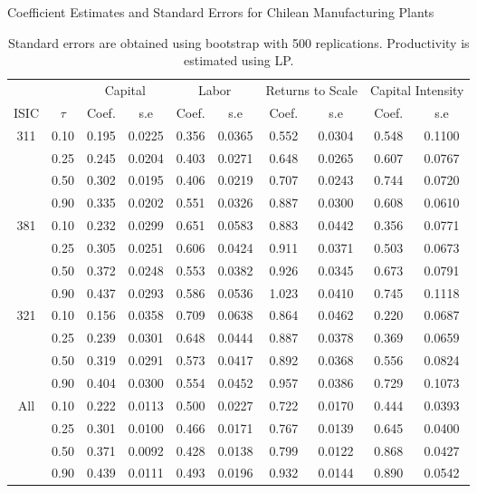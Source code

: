 \documentclass[11pt]{article}
\begin{document}
\begin{table}[H]
\centering
\caption{Coefficient Estimates and Standard Errors for Chilean Manufacturing Plants}
\begin{tabular}{cccccccccc}
  \hline\hline & & \multicolumn{2}{c}{Capital}  & \multicolumn{2}{c}{Labor} & \multicolumn{2}{c}{Returns to Scale} & \multicolumn{2}{c}{Capital Intensity}\\ \cmidrule(lr){3-4} \cmidrule(lr){5-6} \cmidrule(lr){7-8} \cmidrule(lr){9-10}ISIC & $\tau$ & Coef. & s.e & Coef. & s.e & Coef. & s.e & Coef. & s.e \\ 
  \hline
311 & 0.10 & 0.195 & 0.0225 & 0.356 & 0.0365 & 0.552 & 0.0304 & 0.548 & 0.1100 \\ 
   & 0.25 & 0.245 & 0.0204 & 0.403 & 0.0271 & 0.648 & 0.0265 & 0.607 & 0.0767 \\ 
   & 0.50 & 0.302 & 0.0195 & 0.406 & 0.0219 & 0.707 & 0.0243 & 0.744 & 0.0720 \\ 
   & 0.90 & 0.335 & 0.0202 & 0.551 & 0.0326 & 0.887 & 0.0300 & 0.608 & 0.0610 \\ 
  381 & 0.10 & 0.232 & 0.0299 & 0.651 & 0.0583 & 0.883 & 0.0442 & 0.356 & 0.0771 \\ 
   & 0.25 & 0.305 & 0.0251 & 0.606 & 0.0424 & 0.911 & 0.0371 & 0.503 & 0.0673 \\ 
   & 0.50 & 0.372 & 0.0248 & 0.553 & 0.0382 & 0.926 & 0.0345 & 0.673 & 0.0791 \\ 
   & 0.90 & 0.437 & 0.0293 & 0.586 & 0.0536 & 1.023 & 0.0410 & 0.745 & 0.1118 \\ 
  321 & 0.10 & 0.156 & 0.0358 & 0.709 & 0.0638 & 0.864 & 0.0462 & 0.220 & 0.0687 \\ 
   & 0.25 & 0.239 & 0.0301 & 0.648 & 0.0444 & 0.887 & 0.0378 & 0.369 & 0.0659 \\ 
   & 0.50 & 0.319 & 0.0291 & 0.573 & 0.0417 & 0.892 & 0.0368 & 0.556 & 0.0824 \\ 
   & 0.90 & 0.404 & 0.0300 & 0.554 & 0.0452 & 0.957 & 0.0386 & 0.729 & 0.1073 \\ 
  All & 0.10 & 0.222 & 0.0113 & 0.500 & 0.0227 & 0.722 & 0.0170 & 0.444 & 0.0393 \\ 
   & 0.25 & 0.301 & 0.0100 & 0.466 & 0.0171 & 0.767 & 0.0139 & 0.645 & 0.0400 \\ 
   & 0.50 & 0.371 & 0.0092 & 0.428 & 0.0138 & 0.799 & 0.0122 & 0.868 & 0.0427 \\ 
   & 0.90 & 0.439 & 0.0111 & 0.493 & 0.0196 & 0.932 & 0.0144 & 0.890 & 0.0542 \\ 
   \hline
\end{tabular}
\caption*{\footnotesize Standard errors are obtained using bootstrap with 500 replications. Productivity is estimated using LP.}
\label{CHLestLP}
\end{table}
\end{document}

